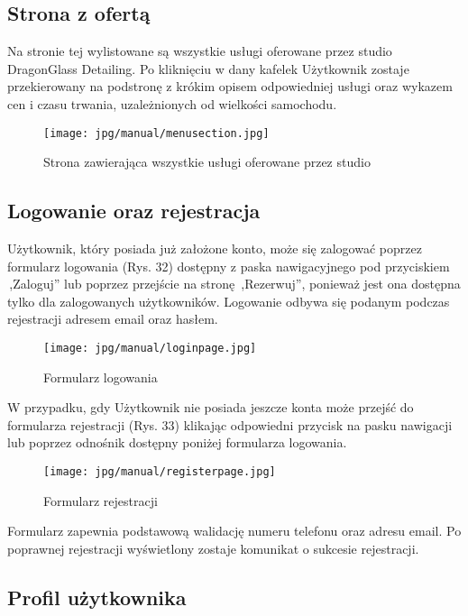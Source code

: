 \documentclass[11pt,a4paper]{article}
\begin{document}
\subsection{Strona z ofertą}

Na stronie tej wylistowane są wszystkie usługi oferowane przez studio DragonGlass Detailing. Po kliknięciu w dany kafelek Użytkownik zostaje przekierowany na podstronę z krókim opisem odpowiedniej usługi oraz wykazem cen i czasu trwania, uzależnionych od wielkości samochodu.

\begin{figure}[H]
    \centering
    \texttt{[image: jpg/manual/menusection.jpg]}
    \caption{Strona zawierająca wszystkie usługi oferowane przez studio}
\end{figure}

\subsection{Logowanie oraz rejestracja}

Użytkownik, który posiada już założone konto, może się zalogować poprzez formularz logowania (Rys. 32) dostępny z paska nawigacyjnego pod przyciskiem \,,Zaloguj'' lub poprzez przejście na stronę \,,Rezerwuj'', ponieważ jest ona dostępna tylko dla zalogowanych użytkowników. Logowanie odbywa się podanym podczas rejestracji adresem email oraz hasłem.

\begin{figure}[H]
    \centering
    \texttt{[image: jpg/manual/loginpage.jpg]}
    \caption{Formularz logowania}
\end{figure}

\noindent
W przypadku, gdy Użytkownik nie posiada jeszcze konta może przejść do formularza rejestracji (Rys. 33) klikając odpowiedni przycisk na pasku nawigacji lub poprzez odnośnik dostępny poniżej formularza logowania. 

\begin{figure}[H]
    \centering
    \texttt{[image: jpg/manual/registerpage.jpg]}
    \caption{Formularz rejestracji}
\end{figure}

\noindent
Formularz zapewnia podstawową walidację numeru telefonu oraz adresu email. Po poprawnej rejestracji wyświetlony zostaje komunikat o sukcesie rejestracji. 

\subsection{Profil użytkownika}
\end{document}
